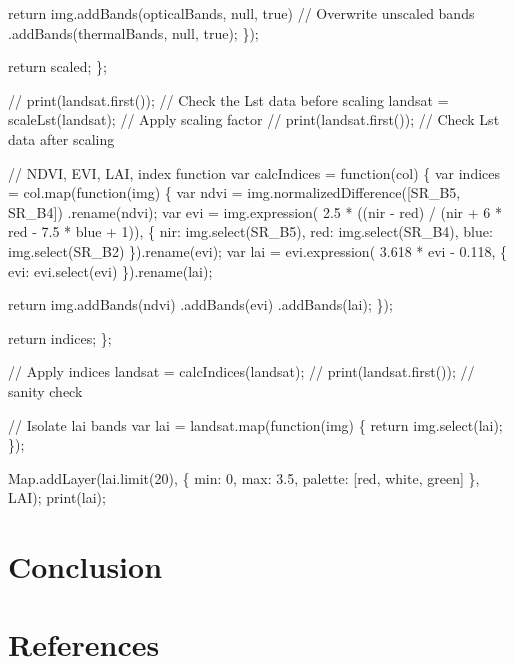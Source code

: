 \documentclass[
]{agujournal2019}
\newenvironment{Shaded}{\begin{snugshade}}{\end{snugshade}}
\newcommand{\NormalTok}[1]{\textcolor[rgb]{0.00,0.23,0.31}{#1}}
\begin{document}
\begin{Shaded}
\begin{Highlighting}[]
\NormalTok{    return img.addBands(opticalBands, null, true)  // Overwrite unscaled bands}
\NormalTok{      .addBands(thermalBands, null, true);}
\NormalTok{  \});}
  
\NormalTok{  return scaled;}
\NormalTok{\};}

\NormalTok{// print(landsat.first());  // Check the Lst data before scaling}
\NormalTok{landsat = scaleLst(landsat);  // Apply scaling factor}
\NormalTok{// print(landsat.first());  // Check Lst data after scaling}

\NormalTok{// NDVI, EVI, LAI, index function}
\NormalTok{var calcIndices = function(col) \{}
\NormalTok{  var indices = col.map(function(img) \{}
\NormalTok{    var ndvi = img.normalizedDifference([\textquotesingle{}SR\_B5\textquotesingle{}, \textquotesingle{}SR\_B4\textquotesingle{}])}
\NormalTok{      .rename(\textquotesingle{}ndvi\textquotesingle{});}
\NormalTok{    var evi = img.expression(}
\NormalTok{      \textquotesingle{}2.5 * ((nir {-} red) / (nir + 6 * red {-} 7.5 * blue + 1))\textquotesingle{},}
\NormalTok{      \{}
\NormalTok{        \textquotesingle{}nir\textquotesingle{}: img.select(\textquotesingle{}SR\_B5\textquotesingle{}),}
\NormalTok{        \textquotesingle{}red\textquotesingle{}: img.select(\textquotesingle{}SR\_B4\textquotesingle{}),}
\NormalTok{        \textquotesingle{}blue\textquotesingle{}: img.select(\textquotesingle{}SR\_B2\textquotesingle{})}
\NormalTok{      \}).rename(\textquotesingle{}evi\textquotesingle{});}
\NormalTok{    var lai = evi.expression(}
\NormalTok{      \textquotesingle{}3.618 * evi {-} 0.118\textquotesingle{}, }
\NormalTok{      \{}
\NormalTok{        \textquotesingle{}evi\textquotesingle{}: evi.select(\textquotesingle{}evi\textquotesingle{})}
\NormalTok{      \}).rename(\textquotesingle{}lai\textquotesingle{});}
      
\NormalTok{    return img.addBands(ndvi)}
\NormalTok{      .addBands(evi)}
\NormalTok{      .addBands(lai);}
\NormalTok{  \});}
  
\NormalTok{  return indices;}
\NormalTok{\};}

\NormalTok{// Apply indices}
\NormalTok{landsat = calcIndices(landsat);}
\NormalTok{// print(landsat.first());  // sanity check}

\NormalTok{// Isolate lai bands}
\NormalTok{var lai = landsat.map(function(img) \{}
\NormalTok{  return img.select(\textquotesingle{}lai\textquotesingle{});}
\NormalTok{\});}

\NormalTok{Map.addLayer(lai.limit(20), \{}
\NormalTok{  min: 0,}
\NormalTok{  max: 3.5,}
\NormalTok{  palette: [\textquotesingle{}red\textquotesingle{}, \textquotesingle{}white\textquotesingle{}, \textquotesingle{}green\textquotesingle{}]}
\NormalTok{\}, \textquotesingle{}LAI\textquotesingle{});}
\NormalTok{print(lai);}
\end{Highlighting}
\end{Shaded}

\section{Conclusion}\label{sec-conclusions}

\section*{References}\label{references}
\end{document}

